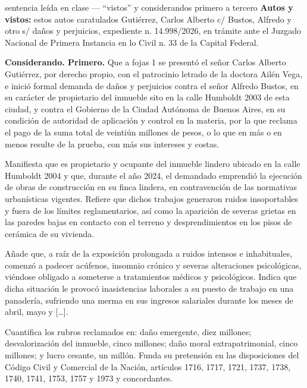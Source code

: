 \documentclass[12pt,oneside]{book}
\begin{document}
\begin{example}{sentencia le\'ida en clase --- ``vistos'' y considerandos primero a tercero}
\textbf{Autos y vistos:} estos autos caratulados \guillemotleft Guti\'errez, Carlos Alberto c/ Bustos, Alfredo y otro s/ da\~nos y perjuicios\guillemotright, expediente n.\textordmasculine{} 14.998/2026, en tr\'amite ante el Juzgado Nacional de Primera Instancia en lo Civil n.\textordmasculine{} 33 de la Capital Federal.

\textbf{Considerando. Primero.} Que a fojas 1 se present\'o el se\~nor Carlos Alberto Guti\'errez, por derecho propio, con el patrocinio letrado de la doctora Ail\'en Vega, e inici\'o formal demanda de da\~nos y perjuicios contra el se\~nor Alfredo Bustos, en su car\'acter de propietario del inmueble sito en la calle Humboldt 2003 de esta ciudad, y contra el Gobierno de la Ciudad Aut\'onoma de Buenos Aires, en su condici\'on de autoridad de aplicaci\'on y control en la materia, por la que reclama el pago de la suma total de veinti\'un millones de pesos, o lo que en m\'as o en menos resulte de la prueba, con m\'as sus intereses y costas.

Manifiesta que es propietario y ocupante del inmueble lindero ubicado en la calle Humboldt 2004 y que, durante el a\~no 2024, el demandado emprendi\'o la ejecuci\'on de obras de construcci\'on en su finca lindera, en contravenci\'on de las normativas urban\'isticas vigentes. Refiere que dichos trabajos generaron ruidos insoportables y fuera de los l\'imites reglamentarios, as\'i como la aparici\'on de severas grietas en las paredes bajas en contacto con el terreno y desprendimientos en los pisos de cer\'amica de su vivienda.

A\~nade que, a ra\'iz de la exposici\'on prolongada a ruidos intensos e inhabituales, comenz\'o a padecer ac\'ufenos, insomnio cr\'onico y severas alteraciones psicol\'ogicas, vi\'endose obligado a someterse a tratamientos m\'edicos y psicol\'ogicos. Indica que dicha situaci\'on le provoc\'o inasistencias laborales a su puesto de trabajo en una panader\'ia, sufriendo una merma en sus ingresos salariales durante los meses de abril, mayo y [\ldots].

Cuantifica los rubros reclamados en: da\~no emergente, diez millones; desvalorizaci\'on del inmueble, cinco millones; da\~no moral extrapatrimonial, cinco millones; y lucro cesante, un mill\'on. Funda su pretensi\'on en las disposiciones del C\'odigo Civil y Comercial de la Naci\'on, art\'iculos 1716, 1717, 1721, 1737, 1738, 1740, 1741, 1753, 1757 y 1973 y concordantes.


\end{example}
\end{document}
